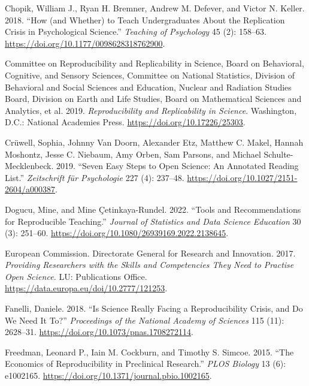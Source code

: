\documentclass[
  a4paper,
]{article}
\newlength{\cslhangindent}
\newenvironment{CSLReferences}[2] %
 {\begin{list}{}{%
  \setlength{\itemindent}{0pt}
  \setlength{\leftmargin}{0pt}
  \setlength{\parsep}{0pt}
  \ifodd #1
   \setlength{\leftmargin}{\cslhangindent}
   \setlength{\itemindent}{-1\cslhangindent}
  \fi
  \setlength{\itemsep}{#2\baselineskip}}}
 {\end{list}}
\begin{document}
\begin{CSLReferences}{1}{0}
Chopik, William J., Ryan H. Bremner, Andrew M. Defever, and Victor N.
Keller. 2018. {``How (and {Whether}) to {Teach Undergraduates About} the
{Replication Crisis} in {Psychological Science}.''} \emph{Teaching of
Psychology} 45 (2): 158--63.
\url{https://doi.org/10.1177/0098628318762900}.

Committee on Reproducibility and Replicability in Science, Board on
Behavioral, Cognitive, and Sensory Sciences, Committee on National
Statistics, Division of Behavioral and Social Sciences and Education,
Nuclear and Radiation Studies Board, Division on Earth and Life Studies,
Board on Mathematical Sciences and Analytics, et al. 2019.
\emph{Reproducibility and {Replicability} in {Science}}. Washington,
D.C.: National Academies Press. \url{https://doi.org/10.17226/25303}.

Crüwell, Sophia, Johnny Van Doorn, Alexander Etz, Matthew C. Makel,
Hannah Moshontz, Jesse C. Niebaum, Amy Orben, Sam Parsons, and Michael
Schulte-Mecklenbeck. 2019. {``Seven {Easy Steps} to {Open Science}: {An
Annotated Reading List}.''} \emph{Zeitschrift f{ü}r Psychologie} 227
(4): 237--48. \url{https://doi.org/10.1027/2151-2604/a000387}.

Dogucu, Mine, and Mine Çetinkaya-Rundel. 2022. {``Tools and
{Recommendations} for {Reproducible Teaching}.''} \emph{Journal of
Statistics and Data Science Education} 30 (3): 251--60.
\url{https://doi.org/10.1080/26939169.2022.2138645}.

European Commission. Directorate General for Research and Innovation.
2017. \emph{Providing Researchers with the Skills and Competencies They
Need to Practise {Open Science}.} LU: Publications Office.
\url{https://data.europa.eu/doi/10.2777/121253}.

Fanelli, Daniele. 2018. {``Is Science Really Facing a Reproducibility
Crisis, and Do We Need It To?''} \emph{Proceedings of the National
Academy of Sciences} 115 (11): 2628--31.
\url{https://doi.org/10.1073/pnas.1708272114}.

Freedman, Leonard P., Iain M. Cockburn, and Timothy S. Simcoe. 2015.
{``The {Economics} of {Reproducibility} in {Preclinical Research}.''}
\emph{PLOS Biology} 13 (6): e1002165.
\url{https://doi.org/10.1371/journal.pbio.1002165}.


\end{CSLReferences}
\end{document}
